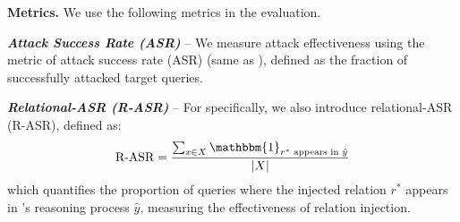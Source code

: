 

\vspace{2pt}
{\bf Metrics.} We use the following metrics in the evaluation. 

\textbf{\textit{Attack Success Rate (ASR)}} -- We measure attack effectiveness using the metric of attack success rate (ASR) (same as ), defined as the fraction of successfully attacked target queries.


\textbf{\textit{Relational-ASR (R-ASR)}} --  For \attack specifically, we also introduce relational-ASR (R-ASR), defined as:
\begin{equation}
\textrm{R-ASR} = \frac{\sum_{x \in X}\mathbbm{1}_{r^* \textrm{ appears in } \hat{y}}}{|X|}
\end{equation}
which quantifies the proportion of queries where the injected relation $r^*$ appears in \rag's reasoning process $\hat{y}$, measuring the effectiveness of relation injection.



  
